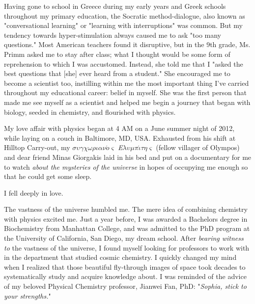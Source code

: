 \documentclass[12pt]{ucsddissertation}
\begin{document}
\begin{preface}
Having gone to school in Greece during my early years and Greek schools throughout my primary education, the Socratic method-dialogue, also known as "conversational learning" or "learning with interruptions" was common. But my tendency towards hyper-stimulation always caused me to ask "too many questions." Most American teachers found it disruptive, but in the 9th grade, Ms. Primm asked me to stay after class; what I thought would be some form of reprehension to which I was accustomed. Instead, she told me that I "asked the best questions that [she] ever heard from a student." She encouraged me to become a scientist too, instilling within me the most important thing I've carried throughout my educational career: belief in myself. She was the first person that made me see myself as a scientist and helped me begin a journey that began with biology, seeded in chemistry, and flourished with physics.

My love affair with physics began at 4 AM on a June summer night of 2012, while laying on a couch in Baltimore, MD, USA.  Exhausted from his shift at Hilltop Carry-out, my $\sigma\upsilon\gamma\chi\omega\rho\iota\alpha\nu\acute{o}\varsigma$ \textit{E}$\lambda\upsilon\mu\pi\acute{\iota}\tau\eta\varsigma$ (fellow villager of Olympos) and dear friend Minas Giorgakis laid in his bed and put on a documentary for me to watch \textit{about the mysteries of the universe} in hopes of occupying me enough so that he could get some sleep.  
\begin{center}
I fell deeply in love. 
\end{center}

The vastness of the universe humbled me. The mere idea of combining chemistry with physics excited me. Just a year before, I was awarded a Bachelors degree in Biochemistry from Manhattan College, and was admitted to the PhD program at the University of California, San Diego, my dream school. After \textit{bearing witness to} the vastness of the universe, I found myself looking for professors to work with in the department that studied cosmic chemistry. I quickly changed my mind when I realized that those beautiful fly-through images of space took decades to systematically study and acquire knowledge about. I was reminded of the advice of my beloved Physical Chemistry professor, Jianwei Fan, PhD: "\textit{Sophia, stick to your strengths.}"\\



\end{preface}
\end{document}
